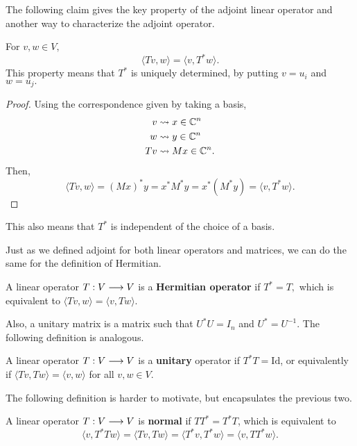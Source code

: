 The following claim gives the key property of the adjoint linear operator and another way to characterize the adjoint operator.

\begin{claim}
For $v, w \in V,$
\[
\langle Tv, w \rangle = \langle v, T^*w\rangle.
\]
This property means that $T^*$ is uniquely determined, by putting $v = u_i$ and $w = u_j.$
\end{claim}

\begin{proof}
Using the correspondence given by taking a basis, 
\begin{align*}
    v &\rightsquigarrow x \in \mathbb C^n \\
    w &\rightsquigarrow y \in \mathbb C^n \\
    Tv &\rightsquigarrow Mx \in \mathbb C^n.
\end{align*}
Then, 
\[
\langle Tv, w \rangle = (Mx)^*y = x^*M^*y = x^*(M^*y) = \langle v, T^*w\rangle.
\]
\end{proof}

This also means that $T^*$ is independent of the choice of a basis.

Just as we defined adjoint for both linear operators and matrices, we can do the same for the definition of Hermitian.
\begin{definition}
A linear operator $T: V \longrightarrow V$ is a \textbf{Hermitian operator} if $T^* = T,$ which is equivalent to $\langle Tv, w \rangle = \langle v, Tw \rangle.$ %
\end{definition}

Also, a unitary matrix is a matrix such that $U^*U = I_n$ and $U^* = U^{-1}.$ The following definition is analogous.
\begin{definition}
A linear operator $T: V \longrightarrow V$ is a \textbf{unitary} operator if $T^*T = \text{Id}$, or equivalently if $\langle Tv, Tw \rangle = \langle v, w \rangle$ for all $v, w \in V.$
\end{definition}

The following definition is harder to motivate, but encapsulates the previous two. 
\begin{definition}
A linear operator $T:V \longrightarrow V$ is \textbf{normal} if $T T^* = T^*T$, which is equivalent to \[\langle v, T^*Tw \rangle = \boxed{\langle Tv, Tw \rangle = \langle T^*v, T^*w \rangle} = \langle v, TT^*w \rangle.\]
\end{definition}

